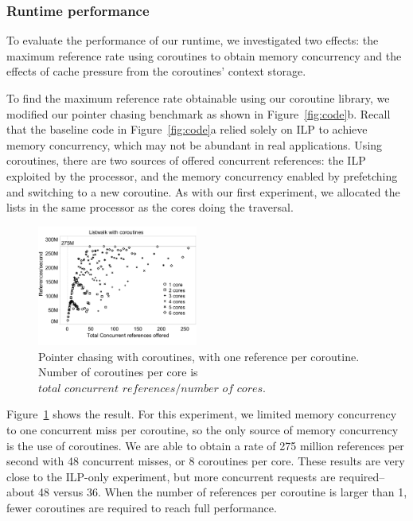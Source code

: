 \documentclass[10pt,nocopyrightspace,preprint]{sigplanconf}
\begin{document}
\subsubsection{Runtime performance}

To evaluate the performance of our runtime, we investigated two
effects: the maximum reference rate using coroutines
to obtain memory concurrency and the effects of cache pressure from the
coroutines' context storage. 

To find the maximum reference rate obtainable using our coroutine
library, we modified our pointer chasing benchmark as shown in
Figure~\ref{fig:code}b. Recall that the baseline code in Figure~\ref{fig:code}a relied solely on ILP to achieve memory concurrency, which may not be abundant in real applications. Using coroutines, there are two sources of offered
concurrent references: the ILP exploited by the processor, and the
memory concurrency enabled by prefetching and switching to a new
coroutine. As with our first experiment, we allocated the lists in the
same processor as the cores doing the traversal. 

\begin{figure}[h]
  \begin{center}
    \includegraphics[width=0.47\textwidth]{figures/multi-green-edited.pdf}
  \end{center}
  \caption{Pointer chasing with coroutines, with one reference per
    coroutine. Number of coroutines per core is $\textit{total concurrent references} / \textit{number of cores}$.}
  \label{fig:multi-green}
\end{figure}

Figure~\ref{fig:multi-green} shows the result. For this
experiment, we limited memory concurrency to one concurrent miss per
coroutine, so the only source of memory concurrency is the use of
coroutines. We are able to obtain a rate of 275 million references per
second with 48 concurrent misses, or 8 coroutines per core. These
results are very close to the ILP-only experiment, but more concurrent requests are required--about 48 versus 36. When the number of references per coroutine is larger than 1, fewer coroutines are required to reach full performance.
\end{document}
